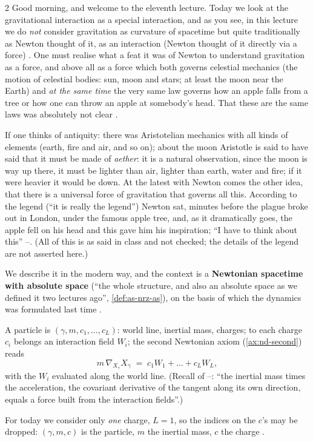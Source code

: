 \begin{paracol}{2}
Good morning, and welcome to the eleventh lecture. Today we look at the gravitational interaction as a special interaction, and as you see, in this lecture we do \emph{not} consider gravitation as curvature of spacetime but quite traditionally as Newton thought of it,
as an interaction (Newton thought of it directly via a force) . One must realise what a feat it was of Newton to understand gravitation as a force, and above all as a force which both governs celestial mechanics (the motion of celestial bodies: sun, moon and stars; at least the moon near the Earth)
and \emph{at the same time} the very same law governs how an apple falls from a tree or how one can throw an apple at somebody's head. That these are the same laws was absolutely not clear .

\begin{aside}
If one thinks of antiquity: there was Aristotelian mechanics with all kinds of elements (earth, fire and air, and so on); about the moon Aristotle is said to have said that it must be made of \emph{aether}: it is a natural observation, since the moon is way up there, it must be lighter than air, lighter than earth, water and fire;
if it were heavier it would be down. At the latest with Newton comes the other idea, that there is a universal force of gravitation that governs all this. According to the legend (``it is really the legend'') Newton sat, minutes before the plague broke out in London, under the famous apple tree, and, as it dramatically goes,
the apple fell on his head and this gave him his inspiration; ``I have to think about this'' --.
(All of this is as said in class and not checked; the details of the legend are not asserted here.)
\end{aside}

We describe it in the modern way, and the context is a \textbf{Newtonian spacetime with absolute space} (``the whole structure, and also an absolute space as we defined it two lectures ago'', \cref{def:as-nrz-as}), on the basis of which the dynamics was formulated last time .

\begin{recall}
A particle is $(\gamma,m,c_1,\dots,c_L)$: world line, inertial mass, charges; to each charge $c_i$ belongs an interaction field $W_i$; the second Newtonian axiom (\cref{ax:nd-second}) reads
\[
  m\,\nabla_{X_\gamma}X_\gamma\;=\;c_1W_1+\dots+c_LW_L ,
\]
with the $W_i$ evaluated along the world line. (Recall of --: ``the inertial mass times the acceleration, the covariant derivative of the tangent along its own direction, equals a force built from the interaction fields''.)
\end{recall}
For today we consider only \emph{one} charge, $L=1$, so the indices on the $c$'s may be dropped: $(\gamma,m,c)$ is the particle, $m$ the inertial mass, $c$ the charge .


\end{paracol}
